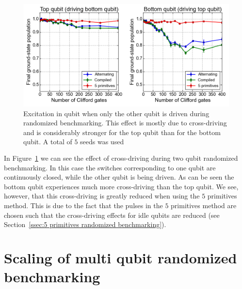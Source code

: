           \begin{figure}[tb]
            \centering
            \includegraphics[width=\textwidth]{../Figures/Randomized benchmarking/RB_2Q_driving_single_vs_both.png}
            \caption{Excitation in qubit when only the other qubit is driven during randomized benchmarking. This effect is mostly due to cross-driving and is considerably stronger for the top qubit than for the bottom qubit. A total of $5$ seeds was used}
            \label{fig:cross driving two qubit randomized benchmarking}
          \end{figure}

          In Figure~\ref{fig:cross driving two qubit randomized benchmarking} we can see the effect of cross-driving during two qubit randomized benchmarking. In this case the switches corresponding to one qubit are continuously closed, while the other qubit is being driven. As can be seen the bottom qubit experiences much more cross-driving than the top qubit. We see, however, that this cross-driving is greatly reduced when using the $5$ primitives method. This is due to the fact that the pulses in the $5$ primitives method are chosen such that the cross-driving effects for idle qubits are reduced (see Section~\ref{ssec:5 primitives randomized benchmarking}).

        \section{Scaling of multi qubit randomized benchmarking}
          \label{sec:scaling of multi qubit randomized benchmarking}

